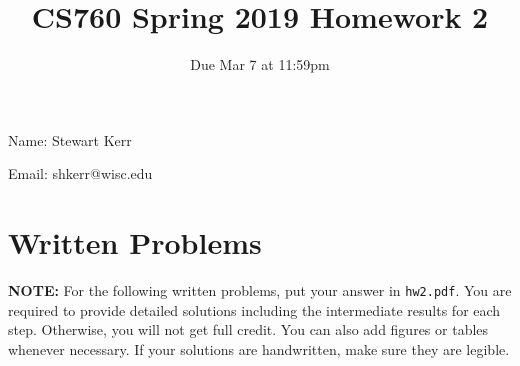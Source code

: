\documentclass{article}
\title{CS760 Spring 2019 Homework 2}
\author{Due Mar 7 at 11:59pm}
\date{}
\begin{document}
\maketitle



Name: Stewart Kerr

Email: shkerr@wisc.edu 



\section*{Written Problems}

\textbf{NOTE:} For the following written problems, put your answer in \texttt{hw2.pdf}. You are required to provide detailed solutions including the intermediate results for each step. Otherwise, you will not get full credit. You can also add figures or tables whenever necessary. If your solutions are handwritten, make sure they are legible.
\end{document}

